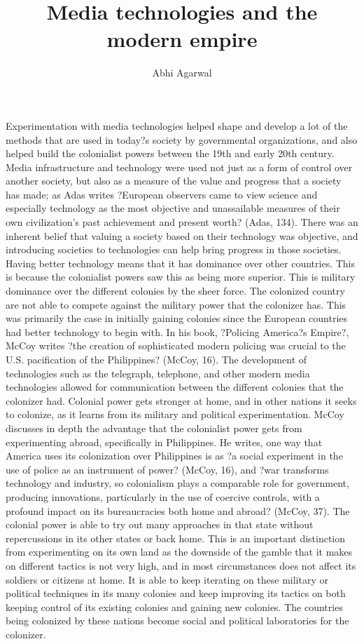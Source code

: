\documentclass[12pt, oneside]{article}
\title{Media technologies and the modern empire\vspace{-0.4cm}}
\author{Abhi Agarwal\vspace{-1cm}}
\date{}
\begin{document}
\maketitle

Experimentation with media technologies helped shape and develop a lot of the methods that are used in today?s society by governmental organizations, and also helped build the colonialist powers between the 19th and early 20th century. Media infrastructure and technology were used not just as a form of control over another society, but also as a measure of the value and progress that a society has made; as Adas writes ?European observers came to view science and especially technology as the most objective and unassailable measures of their own civilization's past achievement and present worth? (Adas, 134). There was an inherent belief that valuing a society based on their technology was objective, and introducing societies to technologies can help bring progress in those societies.
Having better technology means that it has dominance over other countries. This is because the colonialist powers saw this as being more superior. This is military dominance over the different colonies by the sheer force. The colonized country are not able to compete against the military power that the colonizer has. This was primarily the case in initially gaining colonies since the European countries had better technology to begin with. In his book, ?Policing America?s Empire?, McCoy writes ?the creation of sophisticated modern policing was crucial to the U.S. pacification of the Philippines? (McCoy, 16). The development of technologies such as the telegraph, telephone, and other modern media technologies allowed for communication between the different colonies that the colonizer had. 
Colonial power gets stronger at home, and in other nations it seeks to colonize, as it learns from its military and political experimentation. McCoy discusses in depth the advantage that the colonialist power gets from experimenting abroad, specifically in Philippines. He writes, one way that America uses its colonization over Philippines is as ?a social experiment in the use of police as an instrument of power? (McCoy, 16), and ?war transforms technology and industry, so colonialism plays a comparable role for government, producing innovations, particularly in the use of coercive controls, with a profound impact on its bureaucracies both home and abroad? (McCoy, 37). The colonial power is able to try out many approaches in that state without repercussions in its other states or back home. This is an important distinction from experimenting on its own land as the downside of the gamble that it makes on different tactics is not very high, and in most circumstances does not affect its soldiers or citizens at home. It is able to keep iterating on these military or political techniques in its many colonies and keep improving its tactics on both keeping control of its existing colonies and gaining new colonies. The countries being colonized by these nations become social and political laboratories for the colonizer.
\end{document}

